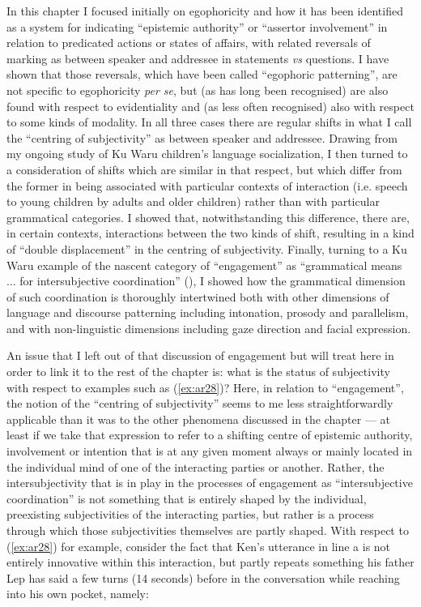 \documentclass[output=paper]{langsci/langscibook}
\begin{document}
In this chapter I focused initially on egophoricity and how it has been identified as a system for indicating “epistemic authority” or “assertor involvement” in relation to predicated actions or states of affairs, with related reversals of marking as between speaker and addressee in statements \textit{vs} questions. I have shown that those reversals, which have been called “egophoric patterning”, are not specific to egophoricity \textit{per se}, but (as has long been recognised) are also found with respect to evidentiality and (as less often recognised) also with respect to some kinds of modality. In all three cases there are regular shifts in what I call the “centring of subjectivity” as between speaker and addressee. Drawing from my ongoing study of Ku Waru children’s language socialization, I then turned to a consideration of shifts which are similar in that respect, but which differ from the former in being associated with particular contexts of interaction (i.e. speech to young children by adults and older children) rather than with particular grammatical categories. I showed that, notwithstanding this difference, there are, in certain contexts, interactions between the two kinds of shift, resulting in a kind of “double displacement” in the centring of subjectivity.  Finally, turning to a Ku Waru example of the nascent category of “engagement” as “grammatical means ... for intersubjective coordination” (\citealt[112]{EvansSchieffelin2018}), I showed how the grammatical dimension of such coordination is thoroughly intertwined both with other dimensions of language and discourse patterning including intonation, prosody and parallelism, and with non-linguistic dimensions including gaze direction and facial expression.

An issue that I left out of that discussion of engagement but will treat here in order to link it to the rest of the chapter is: what is the status of subjectivity with respect to examples such as (\ref{ex:ar28})? Here, in relation to “engagement”, the notion of the “centring of subjectivity” seems to me less straightforwardly applicable than it was to the other phenomena discussed in the chapter — at least if we take that expression to refer to a shifting centre of epistemic authority, involvement or intention that is at any given moment always or mainly located in the individual mind of one of the interacting parties or another. Rather, the intersubjectivity that is in play in the processes of engagement as “intersubjective coordination” is not something that is entirely shaped by the individual, preexisting subjectivities of the interacting parties, but rather is a process through which those subjectivities themselves are partly shaped. With respect to (\ref{ex:ar28}) for example, consider the fact that Ken’s utterance in line a is not entirely innovative within this interaction, but partly repeats something his father Lep has said a few turns (14 seconds) before in the conversation while reaching into his own pocket, namely:
\end{document}
